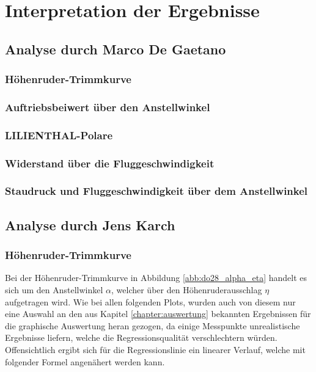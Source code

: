 \chapter{Interpretation der Ergebnisse}
\label{chapter:interpretation}

\section{Analyse durch Marco De Gaetano}
\subsection{Höhenruder-Trimmkurve}
\subsection{Auftriebsbeiwert über den Anstellwinkel}
\subsection{LILIENTHAL-Polare}
\subsection{Widerstand über die Fluggeschwindigkeit}
\subsection{Staudruck und Fluggeschwindigkeit über dem Anstellwinkel}
\newpage

\section{Analyse durch Jens Karch}
\subsection{Höhenruder-Trimmkurve}
Bei der Höhenruder-Trimmkurve in Abbildung \ref{abb:do28_alpha_eta} handelt es sich um den Anstellwinkel $\alpha$, welcher über den Höhenruderausschlag $\eta$ aufgetragen wird. Wie bei allen folgenden Plots, wurden auch von diesem nur eine Auswahl an den aus Kapitel \ref{chapter:auswertung} bekannten Ergebnissen für die graphische Auswertung heran gezogen, da einige Messpunkte unrealistische Ergebnisse liefern, welche die Regressionsqualität verschlechtern würden.\\
Offensichtlich ergibt sich für die Regressionslinie ein linearer Verlauf, welche mit folgender Formel angenähert werden kann.\\

